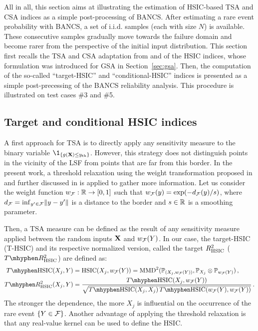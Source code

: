 All in all, this section aims at illustrating the estimation of HSIC-based TSA and CSA indices as a simple post-processing of BANCS. 
After estimating a rare event probability with BANCS, a set of i.i.d. samples (each with size $N$) is available. 
These consecutive samples gradually move towards the failure domain and become rarer from the perspective of the initial input distribution. 
This section first recalls the TSA and CSA adaptation from \citet{marrel_2018} and \citet{marrel_chabridon_2021} of the HSIC indices, whose formulation was introduced for GSA in Section~\ref{sec:gsa}.
Then, the computation of the so-called ``target-HSIC'' and ``conditional-HSIC'' indices is presented as a simple post-precessing of the BANCS reliability analysis. 
This procedure is illustrated on test cases \#3 and \#5. 


\subsection{Target and conditional HSIC indices}

A first approach for TSA is to directly apply any sensitivity measure to the binary variable $\1_{\{g(\bX) \leq \yth\}}$. 
However, this strategy does not distinguish points in the vicinity of the LSF from points that are far from this border. 
In the present work, a threshold relaxation using the weight transformation proposed in \citet{marrel_2018} and further discussed in \citet{marrel_chabridon_2021} is applied to gather more information. 
Let us consider the weight function $w_{\mathcal{F}}: \mathbb{R} \rightarrow [0, 1]$ such that $w_{\mathcal{F}}(y) = \exp(-d_{\mathcal{F}}(y)/s)$, where $d_{\mathcal{F}} = \mathrm{inf}_{y'\in \mathcal{F}} \Vert y -y' \Vert$ is a distance to the border and $s\in\mathbb{R}$ is a smoothing parameter. 

Then, a TSA measure can be defined as the result of any sensitivity measure applied between the random inputs ${\bf X}$ and $w_{\mathcal{F}}(Y)$. 
In our case, the target-HSIC (T-HSIC) and its respective normalized version, called the target $R^2_{\mathrm{HSIC}}$ ($T \mhyphen R^2_{\HSIC}$) are defined as: 
\begin{subequations}
    \begin{align}
        T \mhyphen \HSIC(X_j, Y) & = \HSIC(X_j, w_{\iF}(Y)) = \MMD^2(\P_{(X_j, w_{\iF}(Y))}, \P_{X_j} \otimes \P_{w_{\iF}(Y)})\, ,\\
        T \mhyphen R^2_{\HSIC}(X_j, Y) &= \frac{T \mhyphen \HSIC(X_j, w_{\iF}(Y))}{\sqrt{T \mhyphen \HSIC(X_j, X_j) \, T \mhyphen \HSIC(w_{\iF}(Y), w_{\iF}(Y))}}\, .
    \end{align}
\end{subequations}
The stronger the dependence, the more $X_j$ is influential on the occurrence of the rare event $\{Y\in\mathcal{F}\}$.  
Another advantage of applying the threshold relaxation is that any real-value kernel can be used to define the HSIC. 

